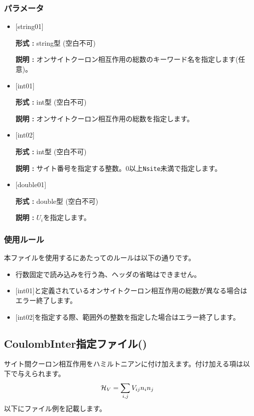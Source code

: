 \subsubsection{パラメータ}
 \begin{itemize}

   \item  $[$string01$]$
   
    {\bf 形式 :} string型 (空白不可)

   {\bf 説明 :} オンサイトクーロン相互作用の総数のキーワード名を指定します(任意)。

   \item  $[$int01$]$
   
    {\bf 形式 :} int型 (空白不可)

   {\bf 説明 :} オンサイトクーロン相互作用の総数を指定します。

  \item  $[$int02$]$
  
 {\bf 形式 :} int型 (空白不可)

{\bf 説明 :} サイト番号を指定する整数。0以上\verb|Nsite|{未満}で指定します。
 
 \item  $[$double01$]$
   
   {\bf 形式 :} double型 (空白不可)

  {\bf 説明 :}  $U_i$を指定します。
  
\end{itemize}

\subsubsection{使用ルール}
本ファイルを使用するにあたってのルールは以下の通りです。
\begin{itemize}
\item 行数固定で読み込みを行う為、ヘッダの省略はできません。
\item $[$int01$]$と定義されているオンサイトクーロン相互作用の総数が異なる場合はエラー終了します。
\item $[$int02$]$を指定する際、範囲外の整数を指定した場合はエラー終了します。
\end{itemize}


\newpage
\subsection{CoulombInter指定ファイル()}
サイト間クーロン相互作用をハミルトニアンに付け加えます。付け加える項は以下で与えられます。
\begin{equation}
{\cal H}_V = \sum_{i,j}V_{ij} n_ {i}n_{j}
\end{equation}
以下にファイル例を記載します。

